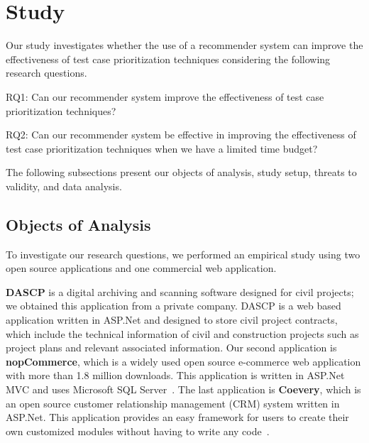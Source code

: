 \section{Study}
\label{sec:study}

Our study investigates whether the use of a recommender system 
can improve the effectiveness of test case prioritization techniques
considering the following research questions.

\begin{smallitem}
\item RQ1: Can our recommender system improve the effectiveness 
of test case prioritization techniques?

\item RQ2: Can our recommender system be effective in improving
the effectiveness of test case prioritization techniques 
when we have a limited time budget?
\end{smallitem}

The following subsections present our objects of analysis, 
study setup, threats to validity, and data analysis.

\subsection{Objects of Analysis}
\label{sec:objects}

To investigate our research questions, we performed an empirical study 
using two open source applications and one commercial web application.

\textbf{DASCP} is a digital archiving and scanning software designed for civil projects; 
we obtained this application from a private company.  
DASCP is a web based application written in ASP.Net and designed to store civil project 
contracts, which include the technical information of civil and construction projects 
such as project plans and relevant associated information. 
Our second application is \textbf{nopCommerce}, which is a widely used open 
source e-commerce web application with more than 1.8 million 
downloads. This application is written in ASP.Net MVC and uses 
Microsoft SQL Server~\cite{nopCommerece}. 
The last application is \textbf{Coevery}, which is an open source 
customer relationship management (CRM) system written in ASP.Net. 
This application provides an easy framework for users to create their own customized 
modules without having to write any code~\cite{coevery}.

